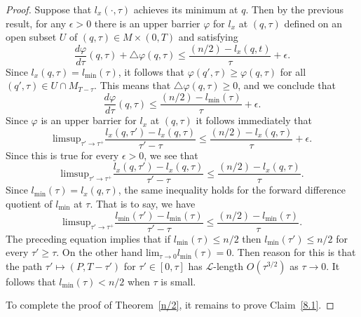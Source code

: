 \begin{proof}
Suppose that $l_x(\cdot,\tau)$ achieves its minimum at $q$. Then by
the previous result, for any $\epsilon>0$ there is an upper barrier
$\varphi$ for $l_x$ at $(q,\tau)$ defined on an open subset $U$ of
$(q,\tau)\in M\times (0,T)$ and satisfying
$$\frac{d\varphi}{d\tau}(q,\tau)+\triangle \varphi(q,\tau)\le \frac{(n/2)-l_x(q,t)}{\tau}+\epsilon.$$
Since $l_x(q,\tau)=l_\mathrm{min}(\tau)$, it follows that
$\varphi(q',\tau)\ge \varphi(q,\tau)$ for all $(q',\tau)\in U\cap
M_{T-\tau}$. This means that $\triangle \varphi(q,\tau)\ge 0$, and
we conclude that
$$\frac{d\varphi}{d\tau}(q,\tau)\le \frac{(n/2)-l_\mathrm{min}(\tau)}{\tau}+\epsilon.$$
Since $\varphi$ is an upper barrier for $l_x$ at $(q,\tau)$ it
follows immediately that
$$\mathrm{limsup}_{\tau'\rightarrow
\tau^+}\frac{l_x(q,\tau')-l_x(q,\tau)}{\tau'-\tau}\le
\frac{(n/2)-l_x(q,\tau)}{\tau}+\epsilon.$$ Since this is true for every
$\epsilon>0$, we see that
$$\mathrm{limsup}_{\tau'\rightarrow
\tau^+}\frac{l_x(q,\tau')-l_x(q,\tau)}{\tau'-\tau}\le
\frac{(n/2)-l_x(q,\tau)}{\tau}.$$ Since $l_\mathrm{min}(\tau)=l_x(q,\tau)$, the same inequality holds for the forward
difference quotient of $l_\mathrm{min}$ at $\tau$. That is to say, we
have
$$\mathrm{limsup}_{\tau'\rightarrow \tau^+}\frac{l_\mathrm{min}(\tau')-l_\mathrm{min}(\tau)}{\tau'-\tau}\le \frac{(n/2)-l_\mathrm{min}(\tau)}{\tau}.$$
The preceding equation implies that if $l_\mathrm{min}(\tau)\le n/2$
then $l_\mathrm{min}(\tau')\le n/2$ for every $\tau'\ge \tau$. On the
other hand $\mathrm{lim}_{\tau\rightarrow 0}l_\mathrm{min}(\tau)=0$. Then
reason for this is that the path $\tau'\mapsto (P,T-\tau')$ for
$\tau'\in [0,\tau]$ has ${\mathcal L}$-length $ O(\tau^{3/2})$ as
$\tau\rightarrow 0$. It follows that $l_\mathrm{min}(\tau)<n/2$ when
$\tau$ is small.


To complete the proof of Theorem~\ref{n/2}, it remains to prove
Claim~\ref{8.1}.


\end{proof}
